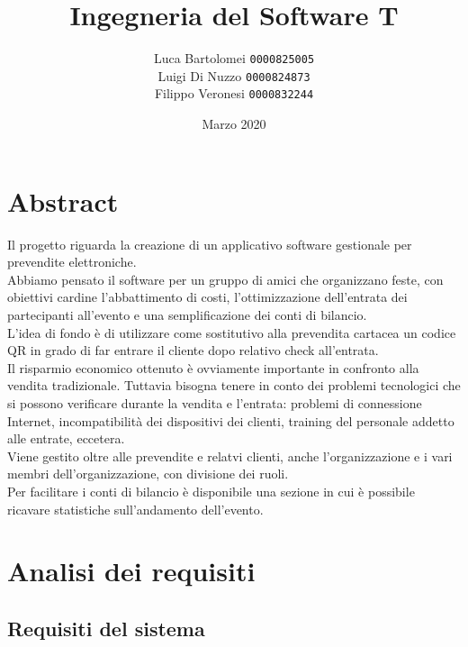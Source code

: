 \documentclass{article}
\title{Ingegneria del Software T}
\author{
    Luca Bartolomei 
    \texttt{0000825005}
    \\
    Luigi Di Nuzzo
    \texttt{0000824873}
    \\
    Filippo Veronesi
    \texttt{0000832244}
}
\date{Marzo 2020}
\begin{document}
\maketitle

\tableofcontents

\newpage

\section{Abstract}

Il progetto riguarda la creazione di un applicativo software gestionale per prevendite elettroniche.\\
Abbiamo pensato il software per un gruppo di amici che organizzano feste, con obiettivi cardine l'abbattimento di costi, l'ottimizzazione dell'entrata dei partecipanti all'evento e una semplificazione dei conti di bilancio.\\
L'idea di fondo è di utilizzare come sostitutivo alla prevendita cartacea un codice QR in grado di far entrare il cliente dopo relativo check all'entrata.\\
Il risparmio economico ottenuto è ovviamente importante in confronto alla vendita tradizionale. Tuttavia bisogna tenere in conto dei problemi tecnologici che si possono verificare durante la vendita e l'entrata: problemi di connessione Internet, incompatibilità dei dispositivi dei clienti, training del personale addetto alle entrate, eccetera.\\
Viene gestito oltre alle prevendite e relatvi clienti, anche l'organizzazione e i vari membri dell'organizzazione, con divisione dei ruoli.\\
Per facilitare i conti di bilancio è disponibile una sezione in cui è possibile ricavare statistiche sull'andamento dell'evento.

\newpage

\section{Analisi dei requisiti}

\subsection{Requisiti del sistema}
\end{document}
